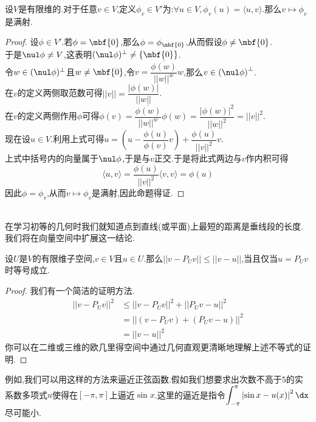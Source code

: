 \documentclass{ctexart}
\begin{document}
\begin{formal}[2.1 Riesz定理]
    设$V$是有限维的.对于任意$v\in V$,定义$\phi_v\in V'$为:$\forall u\in V,\phi_v(u)=\langle u,v\rangle$.那么$v\mapsto\phi_v$是满射.
\end{formal}
\begin{proof}
    设$\phi\in V'$.若$\phi=\mbf{0}$,那么$\phi=\phi_{\mbf{0}}$,从而假设$\phi\neq\mbf{0}$.\\
    于是$\nul\phi\neq V$,这表明$(\nul\phi)^{\bot}\neq\left\{\mbf{0}\right\}$.\\
    令$w\in(\nul\phi)^\bot$且$w\neq\mbf{0}$,令$v=\dfrac{\overline{\phi(w)}}{||w||^w}w$,那么$v\in\left(\nul\phi\right)^\bot$.\\
    在$v$的定义两侧取范数可得$||v||=\dfrac{|\phi(w)|}{||w||}$.\\
    在$v$的定义两侧作用$\phi$可得$\phi(v)=\dfrac{\overline{\phi(w)}}{||w||^w}\phi(w)=\dfrac{|\phi(w)|^2}{||w||^2}=||v||^2$.\\
    现在设$u\in V$.利用上式可得$u=\left(u-\dfrac{\phi(u)}{\phi(v)}v\right)+\dfrac{\phi(u)}{||v||^2}v$.\\
    上式中括号内的向量属于$\nul\phi$,于是与$v$正交.于是将此式两边与$v$作内积可得
    $$\langle u,v\rangle=\dfrac{\phi(u)}{||v||^2}\langle v,v\rangle=\phi(u)$$
    因此$\phi=\phi_v$,从而$v\mapsto\phi_v$是满射,因此命题得证.
\end{proof}\noindent
{}\\
在学习初等的几何时我们就知道点到直线(或平面)上最短的距离是垂线段的长度.我们将在向量空间中扩展这一结论.
\begin{formal}[2.1 到子空间的最短距离]
    设$U$是$V$的有限维子空间,$v\in V$且$u\in U$.那么$||v-P_Uv||\leqslant ||v-u||$,当且仅当$u=P_Uv$时等号成立.
\end{formal}
\begin{proof}
    我们有一个简洁的证明方法.
    $$\begin{aligned}
        ||v-P_Uv||^2
        &\leqslant ||v-P_Uv||^2+||P_Uv-u||^2 \\
        &= ||(v-P_Uv)+(P_Uv-u)||^2 \\
        &= ||v-u||^2
    \end{aligned}$$
    你可以在二维或三维的欧几里得空间中通过几何直观更清晰地理解上述不等式的证明.
\end{proof}\noindent
例如,我们可以用这样的方法来逼近正弦函数.假如我们想要求出次数不高于$5$的实系数多项式$u$使得在$[-\pi,\pi]$上逼近$\sin x$.这里的逼近是指令$\displaystyle\int_{-\pi}^{\pi}\left|\sin x-u(x)\right|^2\dx$尽可能小.\\
\end{document}
